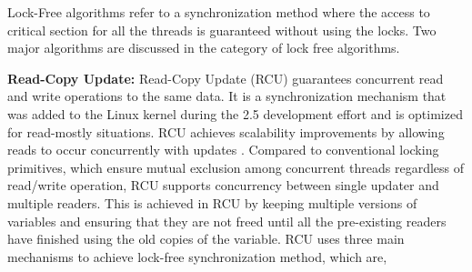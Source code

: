 Lock-Free algorithms refer to a synchronization method where the access to critical section for all the threads is guaranteed without using the locks. Two major algorithms are discussed in the category of lock free algorithms.

\textbf{Read-Copy Update:}
Read-Copy Update (RCU) guarantees concurrent read and write operations to the same data.  It is a synchronization mechanism that was added to the Linux kernel during the 2.5 development effort and is optimized for read-mostly situations. RCU achieves scalability improvements by allowing reads to occur concurrently with updates \cite{whatisrcu}. Compared to conventional locking primitives, which ensure mutual exclusion among concurrent threads regardless of read/write operation, RCU supports concurrency between single updater and multiple readers. This is achieved in RCU by keeping multiple versions of variables and ensuring that they are not freed until all the pre-existing readers have finished using the old copies of the variable. RCU uses three main mechanisms to achieve lock-free synchronization method, which are,

